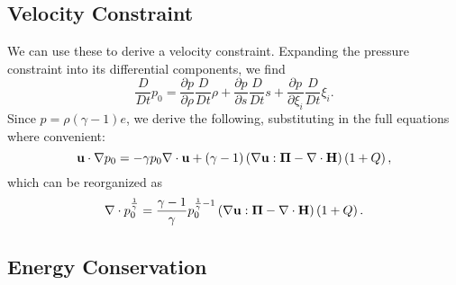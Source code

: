 
\subsection{Velocity Constraint} %
\label{sub:velocity_constraint}

	We can use these to derive a velocity constraint.
		Expanding the pressure constraint into its differential components, we find
		\begin{equation}
			\frac{D}{Dt}p_{0}=\frac{\partial p}{\partial \rho}\frac{D}{Dt}\rho + \frac{\partial p}{\partial s}\frac{D}{Dt}s + \frac{\partial p}{\partial \xi_{i}}\frac{D}{Dt}\xi_{i}.
		\end{equation}
		Since $p=\rho\left(\gamma - 1\right) e$, we derive the following, substituting in the full equations where convenient:
		\begin{equation}
			\mathbf{u}\cdot\nabla p_{0}=-\gamma p_{0}\nabla\cdot{\mathbf{u}} + \left(\gamma - 1\right) \left(\nabla\mathbf{u}:\mathbf{\Pi}-\nabla\cdot{\mathbf{H}}\right)\left(1 + Q\right),
		\end{equation}
		which can be reorganized as
		\begin{equation}
			\nabla\cdot{p_{0}^{\frac{1}{\gamma}}}=\frac{\gamma - 1}{\gamma}p_{0}^{\frac{1}{\gamma}-1}\left(\nabla\mathbf{u}:\mathbf{\Pi}-\nabla\cdot{\mathbf{H}}\right)\left(1 + Q\right).
		\end{equation}



\subsection{Energy Conservation} %
\label{sub:energy_conservation}

